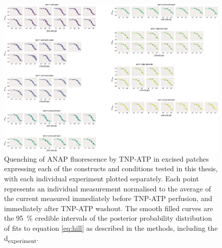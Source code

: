 \begin{figure}[h]
	\centering
	\includegraphics[width=\textwidth]{all_pcf_fits_4.pdf}
	\caption[Excised patch quenching sample hill fits]{
	Quenching of ANAP fluorescence by TNP-ATP in excised patches expressing each of the constructs and conditions tested in this thesis, with each individual experiment plotted separately.
	Each point represents an individual measurement normalised to the average of the current measured immediately before TNP-ATP perfusion, and immediately after TNP-ATP washout.
	The smooth filled curves are the \SI{95}{\percent} credible intervals of the posterior probability distribution of fits to equation \ref{eq:hill} as described in the methods, including the \textgreek{d}\textsubscript{experiment}.
	}
	\label{apxfig:pcf_2}
\end{figure}

